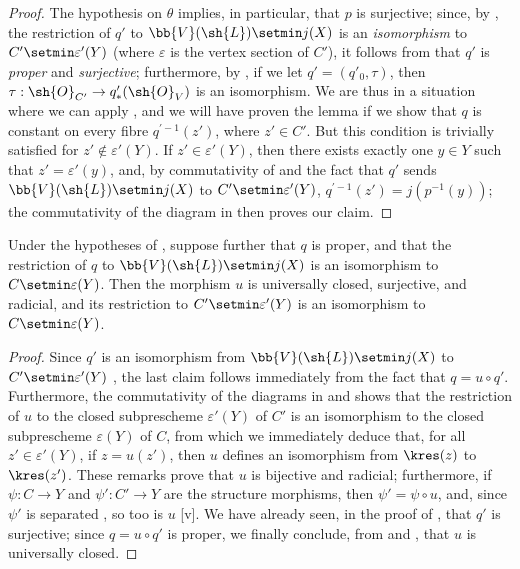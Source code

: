 \begin{proof}
\label{proof-II.8.11.5}
The hypothesis on $\theta$ implies, in particular, that $p$ is surjective;
since, by , the restriction of $q'$ to $\bb{V}(\sh{L})\setmin j(X)$ is an \emph{isomorphism} to $C'\setmin\varepsilon'(Y)$ (where $\varepsilon$ is the vertex section of $C'$), it follows from  that $q'$ is \emph{proper} and \emph{surjective};
furthermore, by , if we let $q'=(q'_0,\tau)$, then $\tau:\sh{O}_{C'}\to q'_*(\sh{O}_V)$ is an isomorphism.
We are thus in a situation where we can apply , and we will have proven the lemma if we show that $q$ is constant on every fibre $q^{'-1}(z')$, where $z'\in C'$.
But this condition is trivially satisfied for $z'\not\in\varepsilon'(Y)$.
If $z'\in\varepsilon'(Y)$, then there exists exactly one $y\in Y$ such that $z'=\varepsilon'(y)$, and, by commutativity of  and the fact that $q'$ sends $\bb{V}(\sh{L})\setmin j(X)$ to $C'\setmin\varepsilon'(Y)$, $q^{'-1}(z')=j(p^{-1}(y))$;
the commutativity of the diagram in  then proves our claim.
\end{proof}

\begin{corollary}[8.11.6]
\label{II.8.11.6}
Under the hypotheses of , suppose further that $q$ is proper, and that the restriction of $q$ to $\bb{V}(\sh{L})\setmin j(X)$ is an isomorphism to $C\setmin\varepsilon(Y)$.
Then the morphism $u$ is universally closed, surjective, and radicial, and its restriction to $C'\setmin\varepsilon'(Y)$ is an isomorphism to $C\setmin\varepsilon(Y)$.
\end{corollary}

\begin{proof}
\label{proof-II.8.11.6}
Since $q'$ is an isomorphism from $\bb{V}(\sh{L})\setmin j(X)$ to $C'\setmin\varepsilon'(Y)$ , the last claim follows immediately from the fact that $q=u\circ q'$.
Furthermore, the commutativity of the diagrams
in  and  shows that the restriction of $u$ to the closed subprescheme $\varepsilon'(Y)$ of $C'$ is an isomorphism to the closed subprescheme $\varepsilon(Y)$ of $C$, from which we immediately deduce that, for all $z'\in\varepsilon'(Y)$, if $z=u(z')$, then $u$ defines an isomorphism from $\kres(z)$ to $\kres(z')$.
These remarks prove that $u$ is bijective and radicial;
furthermore, if $\psi:C\to Y$ and $\psi':C'\to Y$ are the structure morphisms, then $\psi'=\psi\circ u$, and, since $\psi'$ is separated , so too is $u$ [v].
We have already seen, in the proof of , that $q'$ is surjective;
since $q=u\circ q'$ is proper, we finally conclude, from  and , that $u$ is universally closed.
\end{proof}

